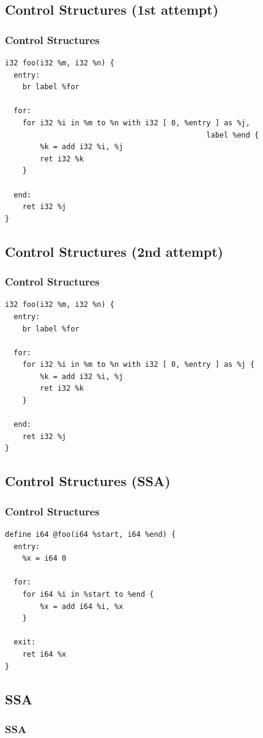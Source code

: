 \documentclass[14pt]{beamer}\beamertemplatenavigationsymbolsempty
\begin{document}
\subsection{Control Structures (1st attempt)}
\begin{frame}[fragile]
 \frametitle{Control Structures}
\begin{lstlisting}
i32 foo(i32 %m, i32 %n) {
  entry:
    br label %for

  for:
    for i32 %i in %m to %n with i32 [ 0, %entry ] as %j,
                                              label %end {
        %k = add i32 %i, %j
        ret i32 %k
    }

  end:
    ret i32 %j
}
\end{lstlisting}
\end{frame}
\subsection{Control Structures (2nd attempt)}
\begin{frame}[fragile]
 \frametitle{Control Structures}
\begin{lstlisting}
i32 foo(i32 %m, i32 %n) {
  entry:
    br label %for

  for:
    for i32 %i in %m to %n with i32 [ 0, %entry ] as %j {
        %k = add i32 %i, %j
        ret i32 %k
    }

  end:
    ret i32 %j
}
\end{lstlisting}
\end{frame}
\subsection{Control Structures (SSA)}
\begin{frame}[fragile]
 \frametitle{Control Structures}
\begin{lstlisting}
define i64 @foo(i64 %start, i64 %end) {
  entry:
    %x = i64 0

  for:
    for i64 %i in %start to %end {
        %x = add i64 %i, %x
    }

  exit:
    ret i64 %x
}
\end{lstlisting}
\end{frame}
\subsection{SSA}
\begin{frame}
 \frametitle{SSA}
 \nocite{braun13simple}
 \printbibliography
\end{frame}
\end{document}
